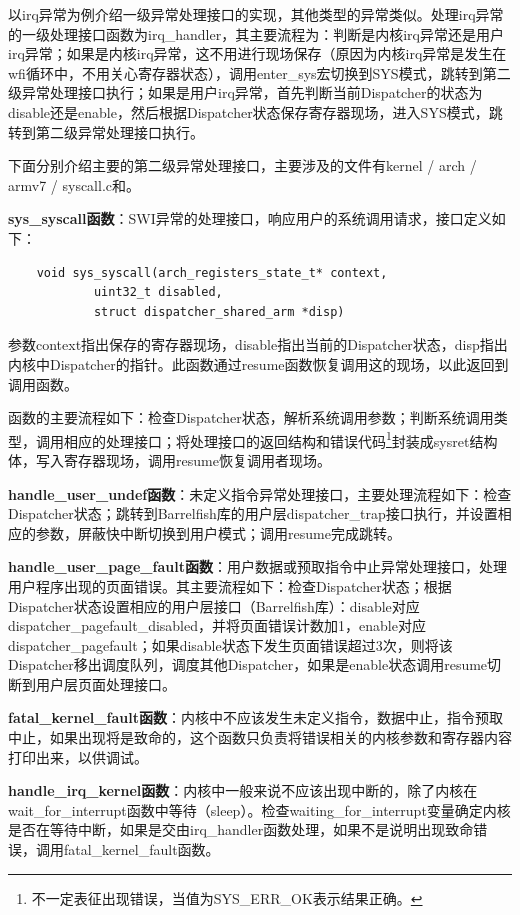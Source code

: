 \documentclass[a4paper, 12pt]{report}
\begin{document}
    以irq异常为例介绍一级异常处理接口的实现，其他类型的异常类似。处理irq异常的一级处理接口函数为irq\_handler，其主要流程为：判断是内核irq异常还是用户irq异常；如果是内核irq异常，这不用进行现场保存（原因为内核irq异常是发生在wfi循环中，不用关心寄存器状态），调用enter\_sys宏切换到SYS模式，跳转到第二级异常处理接口执行；如果是用户irq异常，首先判断当前Dispatcher的状态为disable还是enable，然后根据Dispatcher状态保存寄存器现场，进入SYS模式，跳转到第二级异常处理接口执行。
    
    下面分别介绍主要的第二级异常处理接口，主要涉及的文件有kernel / arch / armv7 / syscall.c和。
    
    \textbf{sys\_syscall函数}：SWI异常的处理接口，响应用户的系统调用请求，接口定义如下：
    
    \begin{lstlisting}
    void sys_syscall(arch_registers_state_t* context,
            uint32_t disabled,
            struct dispatcher_shared_arm *disp)
    \end{lstlisting}
    
    参数context指出保存的寄存器现场，disable指出当前的Dispatcher状态，disp指出内核中Dispatcher的指针。此函数通过resume函数恢复调用这的现场，以此返回到调用函数。
    
    函数的主要流程如下：检查Dispatcher状态，解析系统调用参数；判断系统调用类型，调用相应的处理接口；将处理接口的返回结构和错误代码\footnote{不一定表征出现错误，当值为SYS\_ERR\_OK表示结果正确。}封装成sysret结构体，写入寄存器现场，调用resume恢复调用者现场。
    
    \textbf{handle\_user\_undef函数}：未定义指令异常处理接口，主要处理流程如下：检查Dispatcher状态；跳转到Barrelfish库的用户层dispatcher\_trap接口执行，并设置相应的参数，屏蔽快中断切换到用户模式；调用resume完成跳转。
    
    \textbf{handle\_user\_page\_fault函数}：用户数据或预取指令中止异常处理接口，处理用户程序出现的页面错误。其主要流程如下：检查Dispatcher状态；根据Dispatcher状态设置相应的用户层接口（Barrelfish库）：disable对应dispatcher\_pagefault\_disabled，并将页面错误计数加1，enable对应dispatcher\_pagefault；如果disable状态下发生页面错误超过3次，则将该Dispatcher移出调度队列，调度其他Dispatcher，如果是enable状态调用resume切断到用户层页面处理接口。
    
    \textbf{fatal\_kernel\_fault函数}：内核中不应该发生未定义指令，数据中止，指令预取中止，如果出现将是致命的，这个函数只负责将错误相关的内核参数和寄存器内容打印出来，以供调试。
    
    \textbf{handle\_irq\_kernel函数}：内核中一般来说不应该出现中断的，除了内核在wait\_for\_interrupt函数中等待（sleep）。检查waiting\_for\_interrupt变量确定内核是否在等待中断，如果是交由irq\_handler函数处理，如果不是说明出现致命错误，调用fatal\_kernel\_fault函数。
    
\end{document}
